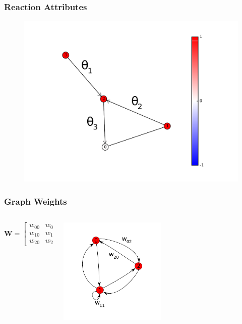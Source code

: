 \documentclass{beamer}
\begin{document}
\begin{frame}
\frametitle{Reaction Attributes}
\begin{figure}
\includegraphics[width=0.8\linewidth]{figs/reaction_graph}
\end{figure}
\end{frame}

\begin{frame}
\frametitle{Graph Weights}
\begin{columns}
\begin{column}{0.3\textwidth}
\[
\mathbf{W}=\left[\begin{array}{ccc}
w_{00} & w_{01} & w_{02}\\
w_{10} & w_{11} & w_{12}\\
w_{20} & w_{21} & w_{22}
\end{array}\right]
\]
\end{column}
\begin{column}{0.7\textwidth}  %
    \begin{center}
     \includegraphics[width=0.5\textwidth]{figs/reacWeights}
     \end{center}
\end{column}
\end{columns}
\end{frame}
\end{document}
